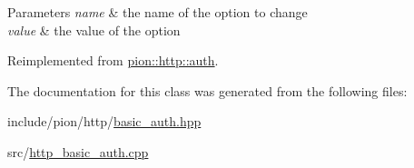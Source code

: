 \begin{DoxyParams}{Parameters}
{\em name} & the name of the option to change \\
\hline
{\em value} & the value of the option \\
\hline
\end{DoxyParams}


Reimplemented from \hyperlink{classpion_1_1http_1_1auth_a49861152e006dc35880152ed0e7a6e92}{pion\-::http\-::auth}.



The documentation for this class was generated from the following files\-:\begin{DoxyCompactItemize}
\item 
include/pion/http/\hyperlink{basic__auth_8hpp}{basic\-\_\-auth.\-hpp}\item 
src/\hyperlink{http__basic__auth_8cpp}{http\-\_\-basic\-\_\-auth.\-cpp}\end{DoxyCompactItemize}
